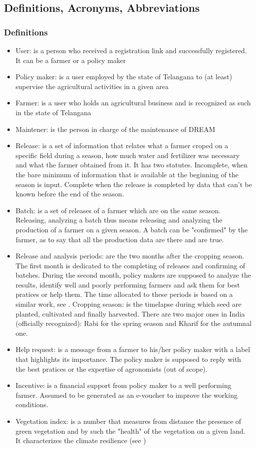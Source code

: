 \subsection{Definitions, Acronyms, Abbreviations}
\subsubsection{Definitions}
\begin{itemize}
	\item User: is a person who received a registration link and successfully registered. It can be a farmer or a policy maker
	\item Policy maker: is a user employed by the state of Telangana to (at least) supervise the agricultural activities in a given area
	\item Farmer: is a user who holds an agricultural business and is recognized as such in the state of Telangana
	\item Maintener: is the person in charge of the maintenance of DREAM
	\item Release: is a set of information that relates what a farmer croped on a specific field during a season, how much water and fertilizer was necessary and what the farmer obtained from it. It has two statutes. Incomplete, when the bare minimum of information that is available at the beginning of the season is input. Complete when the release is completed by data that can't be known before the end of the season.
	\item Batch: is a set of releases of a farmer which are on the same season. Releasing, analyzing a batch thus means releasing and analyzing the production of a farmer on a given season. A batch can be "confirmed" by the farmer, as to say that all the production data are there and are true.
	\item Release and analysis periods: are the two months after the cropping season. The first month is dedicated to the completing of releases and confirming of batches. During the second month, policy makers are supposed to analyze the results, identify well and poorly performing farmers and ask them for best pratices or help them. The time allocated to these periods is based on a similar work, see \cite{seeds}.
	\subitem Cropping season: is the timelapse during which seed are planted, cultivated and finally harvested. There are two major ones in India (officially recognized): Rabi for the spring season and Kharif for the autumnal one.
	\item Help request: is a message from a farmer to his/her policy maker with a label that highlights its importance. The policy maker is supposed to reply with the best pratices or the expertise of agronomists (out of scope).
	\item Incentive: is a financial support from policy maker to a well performing farmer. Assumed to be generated as an e-voucher to improve the working conditions.
	\item Vegetation index: is a number that measures from distance the presence of green vegetation and by such the "health" of the vegetation on a given land. It characterizes the climate resilience (see \cite{vegetationindex})
\end{itemize}

